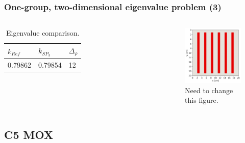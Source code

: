 \begin{frame}
\frametitle{One-group, two-dimensional eigenvalue problem (3)}

\begin{columns}
    \column[t]{5cm}
    \begin{table}[htbp!]
      \centering
      \caption{Eigenvalue comparison.}
      \begin{tabular}{lll}
      \toprule
        $k_{Ref}$ & $k_{SP_3}$  & $\Delta_{\rho}$ \\
      \midrule
        0.79862   & 0.79854     & 12        \\
      \bottomrule
      \end{tabular}
    \end{table}

    \column[t]{5cm}
    \begin{figure}[htbp!]
        \begin{center}
            \includegraphics[width=5cm]{figures/mesh2}
        \end{center}
        \caption{Need to change this figure.}
    \end{figure}
\end{columns}
\end{frame}


\subsection{C5 MOX}

